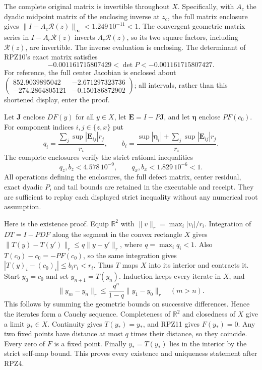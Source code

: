 The complete original matrix is invertible throughout $X$.
Specifically, with $A_c$ the dyadic midpoint matrix of the enclosing
inverse at $z_c$, the full matrix enclosure gives
$\|I-A_c\mathcal R(z)\|_\infty<1.249\,10^{-11}<1$.
The convergent geometric matrix series in $I-A_c\mathcal R(z)$
inverts $A_c\mathcal R(z)$, so its two square factors, including
$\mathcal R(z)$, are invertible. The inverse evaluation is enclosing.
The determinant of RPZ10's exact matrix satisfies
\[
 -0.001161715807429<\det P<-0.001161715807427 .\tag{RPZ11}
\]
For reference, the full center Jacobian is enclosed about
$\left(\begin{smallmatrix}852.9039895042&-2.671297323736\\
-274.2864805121&-0.150186872902\end{smallmatrix}\right)$;
all intervals, rather than this shortened display, enter the proof.

Let $\boldsymbol J$ enclose $DF(y)$ for all $y\in X$, let
$\boldsymbol E=I-P\boldsymbol J$, and let $\boldsymbol\eta$
enclose $PF(c_0)$. For component indices $i,j\in\{z,x\}$ put
\[
 q_i=\frac{\sum_j\sup|\boldsymbol E_{ij}|r_j}{r_i},\qquad
 b_i=\frac{\sup|\boldsymbol\eta_i|
                    +\sum_j\sup|\boldsymbol E_{ij}|r_j}{r_i}.
 \tag{RPZ12}
\]
The complete enclosures verify the strict rational inequalities
\[
 q_z,b_z<4.578\,10^{-9},\qquad
 q_x,b_x<1.829\,10^{-6}<1.\tag{RPZ13}
\]
All operations defining the enclosures, the full defect matrix,
center residual, exact dyadic $P$, and tail bounds are retained in
the executable and receipt. They are sufficient to replay each
displayed strict inequality without any numerical root assumption.

Here is the existence proof. Equip $\mathbb R^2$ with
$\|v\|_r=\max_i|v_i|/r_i$. Integration of $DT=I-PDF$ along the
segment in the convex rectangle $X$ gives
$\|T(y)-T(y')\|_r\le q\|y-y'\|_r$, where
$q=\max_iq_i<1$. Also
$T(c_0)-c_0=-PF(c_0)$, so the same integration gives
$|T(y)_i-(c_0)_i|\le b_ir_i<r_i$.
Thus $T$ maps $X$ into its interior and contracts it.
Start $y_0=c_0$ and set $y_{n+1}=T(y_n)$. Induction keeps every
iterate in $X$, and
\[
 \|y_m-y_n\|_r\le
 \frac{q^n}{1-q}\|y_1-y_0\|_r\quad(m>n).\tag{RPZ14}
\]
This follows by summing the geometric bounds on successive
differences. Hence the iterates form a Cauchy sequence. Completeness
of $\mathbb R^2$ and closedness of $X$ give a limit $y_*\in X$.
Continuity gives $T(y_*)=y_*$, and RPZ11 gives $F(y_*)=0$.
Any two fixed points have distance at most $q$ times their distance,
so they coincide. Every zero of $F$ is a fixed point. Finally
$y_*=T(y_*)$ lies in the interior by the strict self-map bound.
This proves every existence and uniqueness statement after RPZ4.

